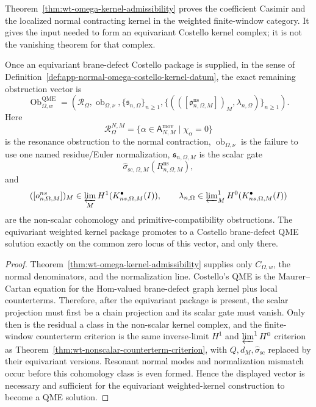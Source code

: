 \begin{cor}\label{cor:wt-omega-denominators-qme-boundary}
  Theorem~\ref{thm:wt-omega-kernel-admissibility} proves the coefficient
  Casimir and the localized normal contracting kernel in the weighted
  finite-window category.  It gives the input needed to form an
  equivariant Costello kernel complex; it is not the vanishing theorem for
  that complex.

  Once an equivariant brane-defect Costello package is supplied, in the
  sense of
  Definition~\ref{def:app-normal-omega-costello-kernel-datum}, the exact
  remaining obstruction vector is
  \[
    \operatorname{Ob}^{\mathrm{QME}}_{\Omega,w}
      =
    \left(
      \mathcal R_{\Omega},
      \operatorname{ob}_{\Omega,\nu},
      \{\mathfrak s_{n,\Omega}\}_{n\geq1},
      \{(([\mathfrak o^{\mathrm{ns}}_{n,\Omega,M}])_M,
          \lambda_{n,\Omega})\}_{n\geq1}
    \right).
  \]
  Here
  \[
    \mathcal R_{\Omega}^{N,M}
      =
    \{\alpha\in\mathsf A^{\mathrm{mov}}_{N,M}
      \mid \chi_\alpha=0\}
  \]
  is the resonance obstruction to the normal contraction,
  \(\operatorname{ob}_{\Omega,\nu}\) is the failure to use one named
  residue/Euler normalization, \(\mathfrak s_{n,\Omega,M}\) is the scalar
  gate
  \[
    \widehat\sigma_{\mathrm{sc},\Omega,M}
      (R^{\mathrm{ns}}_{n,\Omega,M}),
  \]
  and
  \[
    ([\mathfrak o^{\mathrm{ns}}_{n,\Omega,M}])_M
      \in
    \varprojlim_M
    H^1(\mathcal K^\bullet_{\mathrm{ns},\Omega,M}(I)),
    \qquad
    \lambda_{n,\Omega}\in
    \varprojlim\nolimits^1_M
    H^0(\mathcal K^\bullet_{\mathrm{ns},\Omega,M}(I))
  \]
  are the non-scalar cohomology and primitive-compatibility obstructions.
  The equivariant weighted kernel package promotes to a Costello
  brane-defect QME solution exactly on the common zero locus of this
  vector, and only there.
\end{cor}

\begin{proof}
  Theorem~\ref{thm:wt-omega-kernel-admissibility} supplies only
  \(C_{\Omega,w}\), the normal denominators, and the normalization line.
  Costello's QME is the Maurer--Cartan equation for the Hom-valued
  brane-defect graph kernel plus local counterterms.  Therefore, after the
  equivariant package is present, the scalar projection must first be a
  chain projection and its scalar gate must vanish.  Only then is the
  residual a class in the non-scalar kernel complex, and the finite-window
  counterterm criterion is the same inverse-limit \(H^1\) and
  \(\varprojlim^1H^0\) criterion as
  Theorem~\ref{thm:wt-nonscalar-counterterm-criterion}, with
  \(Q,d_M,\widehat\sigma_{\mathrm{sc}}\) replaced by their equivariant
  versions.  Resonant normal modes and normalization mismatch occur before
  this cohomology class is even formed.  Hence the displayed vector is
  necessary and sufficient for the equivariant weighted-kernel construction
  to become a QME solution.
\end{proof}

